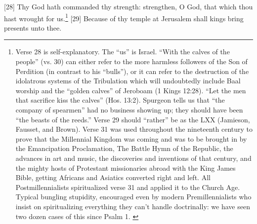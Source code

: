 [28] \textcolor[rgb]{0.00,0.00,1.00}{Thy God hath commanded thy strength: strengthen, O God, that which thou hast wrought for us.}\footnote{Verse 28 is self-explanatory. The “us” is Israel. “With the calves of the people” (vs. 30) can either refer to the more harmless followers of the Son of Perdition (in contrast to his “bulls”), or it can refer to the destruction of the idolatrous systems of the Tribulation which will undoubtedly include Baal worship and the “golden calves” of Jeroboam (1 Kings 12:28). “Let the men that sacrifice kiss the calves” (Hos. 13:2). Spurgeon tells us that “the company of spearmen” had no business showing up; they should have been “the beasts of the reeds.” Verse 29 should “rather” be as the LXX (Jamieson, Fausset, and Brown). Verse 31 was used throughout the nineteenth century to prove that the Millennial Kingdom was coming and was to be brought in by the Emancipation Proclamation, The Battle Hymn of the Republic, the advances in art and music, the discoveries and inventions of that century, and the mighty hosts of Protestant missionaries abroad with the King James Bible, getting Africans and Asiatics converted right and left. All Postmillennialists spiritualized verse 31 and applied it to the Church Age. Typical bungling stupidity, encouraged even by modern Premillennialists who insist on spiritualizing everything they can’t handle doctrinally: we have seen two dozen cases of this since Psalm 1.  \cite{Ruckman1992Psalms}  }
[29] \textcolor[rgb]{0.00,0.00,1.00}{Because of thy temple at Jerusalem shall kings bring presents unto thee.}
